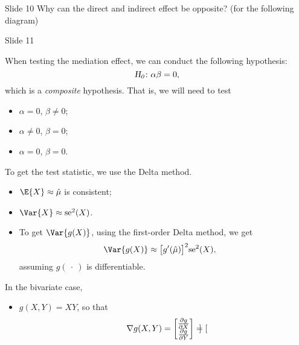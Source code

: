 \begin{Regular}{Slide 10}
    Why can the direct and indirect effect be opposite? (for the following diagram)
    \begin{center}
    \end{center}
\end{Regular}
\begin{Regular}{Slide 11}

    When testing the mediation effect, we can conduct the following hypothesis:
    \[ \textsl{H}_{\textsl{0}}\colon \alpha\beta=0, \]
    which is a \emph{composite} hypothesis. That is, we will need to test
    \begin{itemize}
        \item $ \alpha=0 $, $ \beta\ne 0 $;
        \item $ \alpha\ne 0 $, $ \beta=0 $;
        \item $ \alpha=0 $, $ \beta=0 $.
    \end{itemize}
    To get the test statistic, we use the Delta method.
    \begin{itemize}
        \item $ \E{X}\approx \hat{\mu} $ is consistent;
        \item $ \Var{X}\approx \text{se}^2(X) $.
        \item To get $ \Var{g(X)} $, using the first-order Delta method, we get
              \begin{align*}
                  \Var{g(X)}
                   & \approx \bigl[g^\prime(\hat{\mu})\bigr]^2
                  \text{se}^2(X),
              \end{align*}
              assuming $ g(\:\cdot\:) $ is differentiable.
    \end{itemize}
    In the bivariate case,
    \begin{itemize}
        \item $ g(X,Y)=XY $, so that
              \[ \nabla g(X,Y)=\begin{bmatrix}
                      \pdv{g}{X} \\
                      \pdv{g}{Y}
                  \end{bmatrix}=
                  \begin{bmatrix}

\end{bmatrix}\]
\end{itemize}
\end{Regular}
